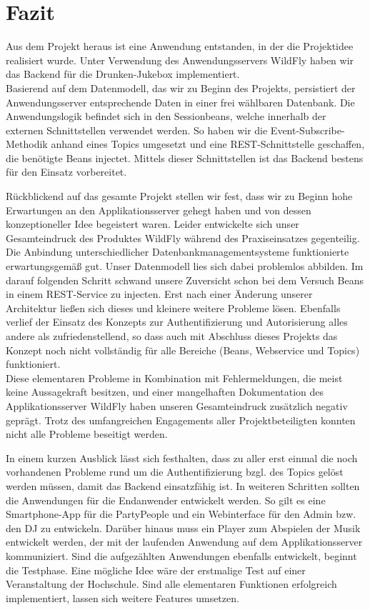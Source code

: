 \newpage
\section{Fazit}
Aus dem Projekt heraus ist eine Anwendung entstanden, in der die Projektidee realisiert wurde. Unter Verwendung des Anwendungsservers WildFly haben wir das Backend für die Drunken-Jukebox implementiert.\\
Basierend auf dem Datenmodell, das wir zu Beginn des Projekts, persistiert der Anwendungsserver entsprechende Daten in einer frei wählbaren Datenbank. Die Anwendungslogik befindet sich in den Sessionbeans, welche innerhalb der externen Schnittstellen verwendet werden. So haben wir die Event-Subscribe-Methodik anhand eines Topics umgesetzt und eine REST-Schnittstelle geschaffen, die benötigte Beans injectet. Mittels dieser Schnittstellen ist das Backend bestens für den Einsatz vorbereitet. 

Rückblickend auf das gesamte Projekt stellen wir fest, dass wir zu Beginn hohe Erwartungen an den Applikationsserver gehegt haben und von dessen konzeptioneller Idee begeistert waren. Leider entwickelte sich unser Gesamteindruck des Produktes WildFly während des Praxiseinsatzes gegenteilig. \\
Die Anbindung unterschiedlicher Datenbankmanagementsysteme funktionierte erwartungsgemäß gut. Unser Datenmodell lies sich dabei problemlos abbilden. Im darauf folgenden Schritt schwand unsere Zuversicht schon bei dem Versuch Beans in einem REST-Service zu injecten. Erst nach einer Änderung unserer Architektur ließen sich dieses und kleinere weitere Probleme lösen. Ebenfalls verlief der Einsatz des Konzepts zur Authentifizierung und Autorisierung alles andere als zufriedenstellend, so dass auch mit Abschluss dieses Projekts das Konzept noch nicht vollständig für alle Bereiche (Beans, Webservice und Topics) funktioniert.\\
Diese elementaren Probleme in Kombination mit Fehlermeldungen, die meist keine Aussagekraft besitzen, und einer mangelhaften Dokumentation des Applikationsserver WildFly haben unseren Gesamteindruck zusätzlich negativ geprägt. Trotz des umfangreichen Engagements aller Projektbeteiligten konnten nicht alle Probleme beseitigt werden.

In einem kurzen Ausblick lässt sich festhalten, dass zu aller erst einmal die noch vorhandenen Probleme rund um die Authentifizierung bzgl. des Topics gelöst werden müssen, damit das Backend einsatzfähig ist. In weiteren Schritten sollten die Anwendungen für die Endanwender entwickelt werden. So gilt es eine Smartphone-App für die PartyPeople und ein Webinterface für den Admin bzw. den DJ zu entwickeln. Darüber hinaus muss ein Player zum Abspielen der Musik entwickelt werden, der mit der laufenden Anwendung auf dem Applikationsserver kommuniziert.
Sind die aufgezählten Anwendungen ebenfalls entwickelt, beginnt die Testphase. Eine mögliche Idee wäre der erstmalige Test auf einer Veranstaltung der Hochschule. Sind alle elementaren Funktionen erfolgreich implementiert, lassen sich weitere Features umsetzen.
